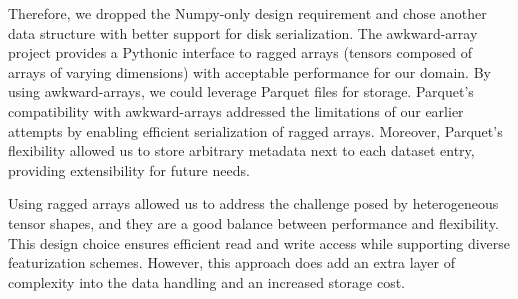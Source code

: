 \documentclass[9pt,lessons, pubversion]{livecoms}
\newcommand{\revision}[1]{\textcolor{black}{#1}}
\begin{document}



Therefore, we dropped the Numpy-only design requirement and chose another data structure with better support for disk serialization. The awkward-array project \revision{\cite{pivarski2020awkward}} provides a Pythonic interface to ragged arrays (tensors composed of arrays of varying dimensions) with acceptable performance for our domain. By using awkward-arrays, we could leverage Parquet files for storage. Parquet's compatibility with awkward-arrays addressed the limitations of our earlier attempts by enabling efficient serialization of ragged arrays. Moreover, Parquet's flexibility allowed us to store arbitrary metadata next to each dataset entry, providing extensibility for future needs.

Using ragged arrays allowed us to address the challenge posed by heterogeneous tensor shapes, and they are a good balance between performance and flexibility. This design choice ensures efficient read and write access while supporting diverse featurization schemes. However, this approach does add an extra layer of complexity into the data handling and an increased storage cost.

\end{document}
